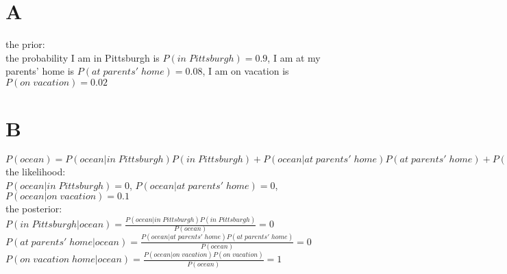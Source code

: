 \documentclass[aps,floatfix,prd]{revtex4}
\begin{document}
\author{Hongbo Cai}


\date{\today}
\setlength{\baselineskip}{20pt}

\maketitle

\section{A}
\noindent
the prior:
\\the probability I am in Pittsburgh is $P(in\;Pittsburgh)=0.9$, I am at my parents' home is $P(at\;parents'\;home)=0.08$, I am on vacation is $P(on\;vacation)=0.02$

\section{B}
\noindent
$P(ocean)=P(ocean|in\;Pittsburgh)P(in\;Pittsburgh)+P(ocean|at\;parents'\;home)P(at\;parents'\;home)+P(ocean|on\;vacation)P(on\;vacation)=0.02\times0.1=0.002$
\\
the likelihood: 
\\$P(ocean|in\;Pittsburgh)=0$, $P(ocean|at\;parents'\;home)=0$, $P(ocean|on\;vacation)=0.1$
\\
the posterior:
\\ $P(in\;Pittsburgh|ocean)=\frac{P(ocean|in\;Pittsburgh)P(in\;Pittsburgh)}{P(ocean)}=0$
\\
$P(at\;parents'\;home|ocean)=\frac{P(ocean|at\;parents'\;home)P(at\;parents'\;home)}{P(ocean)}=0$
\\
$P(on\;vacation\;home|ocean)=\frac{P(ocean|on\;vacation)P(on\;vacation)}{P(ocean)}=1$
\end{document}
